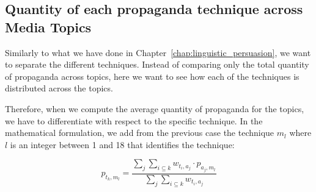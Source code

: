 \subsection{\statusgreen Quantity of each propaganda technique across Media Topics}
\label{ssec:topic_propaganda_tech}

Similarly to what we have done in Chapter~\ref{chap:linguistic_persuasion}, we want to separate the different techniques. Instead of comparing only the total quantity of propaganda across topics, here we want to see how each of the techniques is distributed across the topics. 

Therefore, when we compute the average quantity of propaganda for the topics, we have to differentiate with respect to the specific technique. In the mathematical formulation, we add from the previous case the technique $m_{l}$ where $l$ is an integer between 1 and 18 that identifies the technique:

$$ p_{t_{k},m_{l}} = \frac{ \sum_{j} \sum_{i\subseteq k} w_{t_{i},a_{j}} \cdot p_{a_{j},m_{l}} }{ \sum_{j} \sum_{i\subseteq k} w_{t_{i},a_{j}} } $$


